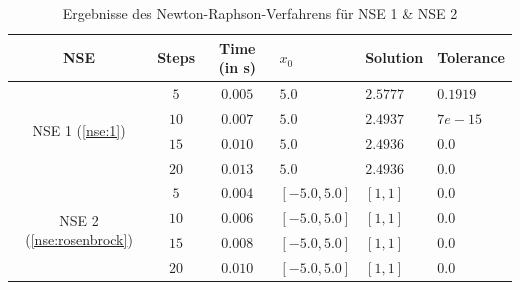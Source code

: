 \documentclass{article}
\theoremstyle{newline}
\begin{document}
\begin{onehalfspace}
\begin{table}[h]
	\centering
	
	\begin{tabular}{c||c|c|>{\centering\arraybackslash}p{2cm}|>{\centering\arraybackslash}p{3cm}|>{\centering\arraybackslash}p{2.5cm}}
		\textbf{NSE} & \textbf{Steps} & \textbf{Time} (in s) & \textbf{$x_0$} & \textbf{Solution} & \textbf{Tolerance}  \\
		\hline
		\multirow{4}{*}{NSE 1 (\ref{nse:1})} & $5$ & $0.005$ & $5.0$ & $2.5777$ & $0.1919$\\
		& $10$ & $0.007$ & $5.0$ & $2.4937$ & $7e-15$\\
		& $15$ & $0.010$ & $5.0$ & $2.4936$ & $0.0$\\
		& $20$ & $0.013$ & $5.0$ & $2.4936$ & $0.0$\\
		\hline
		\multirow{4}{*}{NSE 2 (\ref{nse:rosenbrock})} & $5$ & $0.004$ & $[-5.0, 5.0]$ & $[1, 1]$ & $0.0$\\
		 & $10$ & $0.006$ & $[-5.0, 5.0]$ & $[1, 1]$ & $0.0$\\
		 & $15$ & $0.008$ & $[-5.0, 5.0]$ & $[1, 1]$ & $0.0$\\
		 & $20$ & $0.010$ & $[-5.0, 5.0]$ & $[1, 1]$ & $0.0$\\
	\end{tabular}
	\caption{Ergebnisse des Newton-Raphson-Verfahrens für NSE 1 \& NSE 2}
	\label{tab:Ergebnisse-Newton}
\end{table}


\end{onehalfspace}
\end{document}
